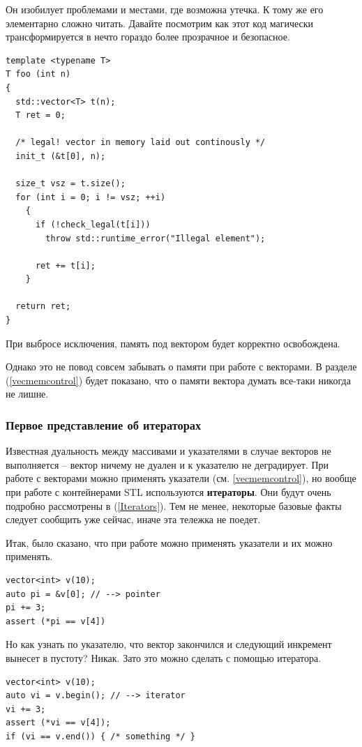 \documentclass[a4paper,12pt,oneside]{article}
\begin{document}
Он изобилует проблемами и местами, где возможна утечка. К тому же его элементарно сложно читать. Давайте посмотрим как этот код магически трансформируется в нечто гораздо более прозрачное и безопасное.

\begin{lstlisting}
template <typename T>
T foo (int n)
{
  std::vector<T> t(n);
  T ret = 0;

  /* legal! vector in memory laid out continously */
  init_t (&t[0], n); 

  size_t vsz = t.size();
  for (int i = 0; i != vsz; ++i)
    {
      if (!check_legal(t[i]))
        throw std::runtime_error("Illegal element");

      ret += t[i];
    }

  return ret;
}
\end{lstlisting}

При выбросе исключения, память под вектором будет корректно освобождена.

Однако это не повод совсем забывать о памяти при работе с векторами. В разделе (\ref{vecmemcontrol}) будет показано, что о памяти вектора думать все-таки никогда не лишне.

\subsubsection{Первое представление об итераторах}

Известная дуальность между массивами и указателями в случае векторов не выполняется -- вектор ничему не дуален и к указателю не деградирует. При работе с векторами можно применять указатели (см. \ref{vecmemcontrol}), но вообще при работе с контейнерами STL используются \textbf{итераторы}. Они будут очень подробно рассмотрены в (\ref{Iterators}). Тем не менее, некоторые базовые факты следует сообщить уже сейчас, иначе эта тележка не поедет.

Итак, было сказано, что при работе можно применять указатели и их можно применять.

\begin{lstlisting}
vector<int> v(10); 
auto pi = &v[0]; // --> pointer
pi += 3;
assert (*pi == v[4])
\end{lstlisting}

Но как узнать по указателю, что вектор закончился и следующий инкремент вынесет в пустоту? Никак. Зато это можно сделать с помощью итератора.

\begin{lstlisting}
vector<int> v(10);
auto vi = v.begin(); // --> iterator
vi += 3;
assert (*vi == v[4]);
if (vi == v.end()) { /* something */ }
\end{lstlisting}
\end{document}
